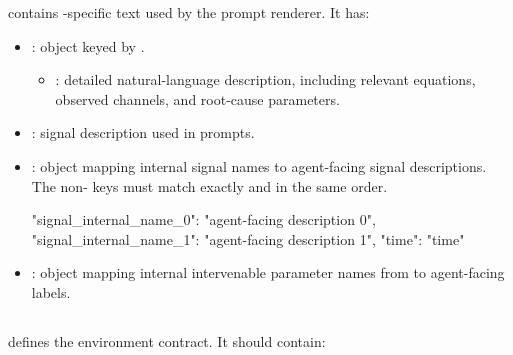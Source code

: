 \documentclass[11pt]{article}
\begin{document}
 contains \termSimulator-specific text used by the prompt renderer.
It has:
\begin{itemize}
\item {}: object keyed by \termDescLevel.
\begin{itemize}
\item {}: detailed natural-language description, including relevant equations, observed channels, and root-cause parameters.
\end{itemize}
\item {}: signal description used in prompts.
\item {}: object mapping internal signal names to agent-facing signal descriptions.
The non- keys must match  exactly and in the same order.
\begin{DocCode}
{
  "signal_internal_name_0": "agent-facing description 0",
  "signal_internal_name_1": "agent-facing description 1",
  "time": "time"
}
\end{DocCode}
\item {}: object mapping internal intervenable parameter names from  to agent-facing labels.
\end{itemize}


\label{sec:environment-experiment-config}
\subsection*{\texorpdfstring{}{experiment\_config.json}}

 defines the environment contract.
It should contain:
\end{document}
